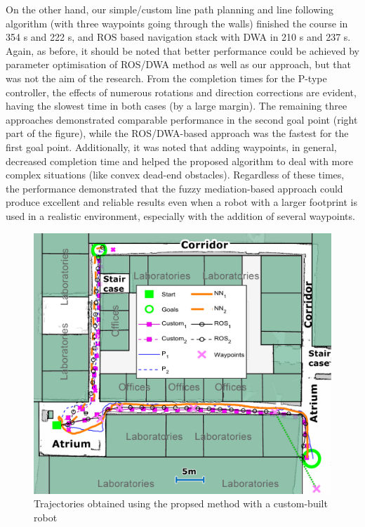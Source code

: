 On the other hand, our simple/custom line path planning and line following algorithm (with three waypoints going through the walls) finished the course in 354 s and 222 s, and ROS based navigation stack with DWA in 210 s and 237 s. Again, as before, it should be noted that better performance could be achieved by parameter optimisation of ROS/DWA method as well as our approach, but that was not the aim of the research. From the completion times for the P-type controller, the effects of numerous rotations and direction corrections are evident, having the slowest time in both cases (by a large margin). The remaining three approaches demonstrated comparable performance in the second goal point (right part of the figure), while the ROS/DWA-based approach was the fastest for the first goal point. Additionally, it was noted that adding waypoints, in general, decreased completion time and helped the proposed algorithm to deal with more complex situations (like convex dead-end obstacles). Regardless of these times, the performance demonstrated that the fuzzy mediation-based approach could produce excellent and reliable results even when a robot with a larger footprint is used in a realistic environment, especially with the addition of several waypoints.

\begin{figure}
\centering
\includegraphics[width=0.85\columnwidth]{slike/res_hodnik2.jpg}
\caption{Trajectories obtained using the propsed method with a custom-built robot}
\label{Fig:Trajektorije_hodnik2}
\end{figure}

